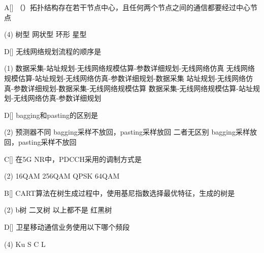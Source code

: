 \begin{choice}{A}[]
    （\quad）拓扑结构存在若干节点中心，且任何两个节点之间的通信都要经过中心节点
    \begin{tasks}(4)
        \task 树型
        \task 网状型
        \task 环形
        \task 星型
    \end{tasks}
\end{choice}


\begin{choice}{D}[]
    无线网络规划流程的顺序是
    \begin{tasks}(1)
        \task 数据采集-站址规划-无线网络规模估算-参数详细规划-无线网络仿真
        \task 无线网络规模估算-站址规划-无线网络仿真-参数详细规划-数据采集
        \task 站址规划-无线网络仿真-参数详细规划-数据采集-无线网络规模估算
        \task 数据采集-无线网络规模估算-站址规划-无线网络仿真-参数详细规划
    \end{tasks}
\end{choice}


\begin{choice}{D}[]
    bagging和pasting的区别是
    \begin{tasks}(2)
        \task 预测器不同
        \task bagging采样不放回，pasting采样放回
        \task 二者无区别
        \task bagging采样放回，pasting采样不放回
    \end{tasks}
\end{choice}



\begin{choice}{C}[]
    在5G NR中，PDCCH采用的调制方式是
    \begin{tasks}(2)
        \task 16QAM
        \task 256QAM
        \task QPSK
        \task 64QAM
    \end{tasks}
\end{choice}


\begin{choice}{B}[]
    CART算法在树生成过程中，使用基尼指数选择最优特征，生成的树是
    \begin{tasks}(2)
        \task b树
        \task 二叉树
        \task 以上都不是
        \task 红黑树
    \end{tasks}
\end{choice}


\begin{choice}{D}[]
    卫星移动通信业务使用以下哪个频段
    \begin{tasks}(4)
        \task Ku
        \task S
        \task C
        \task L
    \end{tasks}
\end{choice}


